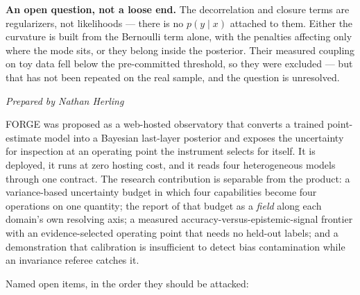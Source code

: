 \documentclass[11pt]{article}
\newcommand{\preparedby}{%
  \par\nobreak\vspace{-6pt}%
  {\footnotesize\itshape\color{forgemute}Prepared by Nathan Herling}%
  \par\vspace{4pt}}
\begin{document}
\textbf{An open question, not a loose end.} The decorrelation and closure
terms are regularizers, not likelihoods --- there is no $p(y\mid x)$ attached
to them. Either the curvature is built from the Bernoulli term alone, with the
penalties affecting only where the mode sits, or they belong inside the
posterior. Their measured coupling on toy data fell below the pre-committed
threshold, so they were excluded --- but that has not been repeated on the real
sample, and the question is unresolved.

\preparedby
\newsection

FORGE was proposed as a web-hosted observatory that converts a trained
point-estimate model into a Bayesian last-layer posterior and exposes the
uncertainty for inspection at an operating point the instrument selects for
itself. It is deployed, it runs at zero hosting cost, and it
reads four heterogeneous models through one contract. The research
contribution is separable from the product: a variance-based uncertainty
budget in which four capabilities become four operations on one quantity; the
report of that budget as a \emph{field} along each domain's own resolving
axis; a measured accuracy-versus-epistemic-signal frontier with an
evidence-selected operating point that needs no held-out labels; and a
demonstration that calibration is insufficient to detect bias contamination
while an invariance referee catches it.

Named open items, in the order they should be attacked:
\end{document}
